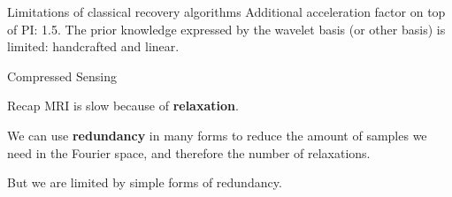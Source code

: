 


\begin{frame}{Limitations of classical recovery algorithms}
    Additional acceleration factor on top of PI: 1.5. %
    \pause
    The prior knowledge expressed by the wavelet basis (or other basis) is limited: handcrafted and linear.
\end{frame}

\begin{frame}{Compressed Sensing}
    \begin{block}{Recap}
        MRI is slow because of \textbf{relaxation}. 
        
        \pause
        We can use \textbf{redundancy} in many forms to reduce the amount of samples we need in the Fourier space, and therefore the number of relaxations.
        
        \pause
        But we are limited by simple forms of redundancy.
    \end{block}
\end{frame}